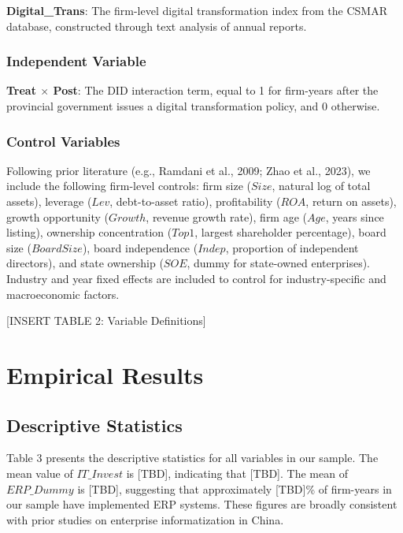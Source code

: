 \documentclass[12pt]{article}
\begin{document}
\textbf{Digital\_Trans}: The firm-level digital transformation index from the CSMAR database, constructed through text analysis of annual reports.

\subsubsection{Independent Variable}

\textbf{Treat $\times$ Post}: The DID interaction term, equal to 1 for firm-years after the provincial government issues a digital transformation policy, and 0 otherwise.

\subsubsection{Control Variables}

Following prior literature (e.g., Ramdani et al., 2009; Zhao et al., 2023), we include the following firm-level controls: firm size ($Size$, natural log of total assets), leverage ($Lev$, debt-to-asset ratio), profitability ($ROA$, return on assets), growth opportunity ($Growth$, revenue growth rate), firm age ($Age$, years since listing), ownership concentration ($Top1$, largest shareholder percentage), board size ($BoardSize$), board independence ($Indep$, proportion of independent directors), and state ownership ($SOE$, dummy for state-owned enterprises). Industry and year fixed effects are included to control for industry-specific and macroeconomic factors.

[INSERT TABLE 2: Variable Definitions]

\section{Empirical Results}

\subsection{Descriptive Statistics}

Table 3 presents the descriptive statistics for all variables in our sample. The mean value of $IT\_Invest$ is [TBD], indicating that [TBD]. The mean of $ERP\_Dummy$ is [TBD], suggesting that approximately [TBD]\% of firm-years in our sample have implemented ERP systems. These figures are broadly consistent with prior studies on enterprise informatization in China.
\end{document}
